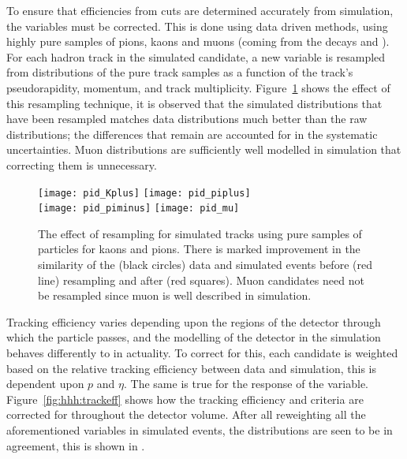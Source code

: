 To ensure that efficiencies from \pid cuts are determined accurately from simulation, the variables
must be corrected.
This is done using data driven methods, using highly pure samples of pions, kaons
and muons (coming from the decays \decay{\Dstarp}{\Dz(\to\kpi)\pip} and
\jpsitomumu).
For each hadron track in the simulated \Bp candidate, a new \pid variable is resampled from \pid
distributions of the pure track samples as a function of the track's pseudorapidity, momentum, and
track multiplicity.
Figure~\ref{fig:hhh:pid} shows the effect of this resampling technique, it is observed that the
simulated \pid distributions that have been resampled matches data distributions much better than the
raw distributions; the differences that remain are accounted for in the systematic uncertainties.
Muon \pid distributions are sufficiently well modelled in simulation that correcting them is
unnecessary.

\begin{figure}[t]
  \begin{center}
    \texttt{[image: pid\_Kplus]}
    \texttt{[image: pid\_piplus]}\\
    \texttt{[image: pid\_piminus]}
    \texttt{[image: pid\_mu]}
    \caption[Effect of resampling PID variables in simulation]
    {
      The effect of \pid resampling for simulated tracks using pure samples of particles for kaons
      and pions.
      There is marked improvement in the similarity of the (black circles) \btojpsikpipi data and
      simulated events before (red line) resampling and after (red squares).
      Muon candidates need not be resampled since muon \pid is well described in simulation.
    }
    \label{fig:hhh:pid}
  \end{center}
\end{figure}


Tracking efficiency varies depending upon the regions of the detector through which the particle
passes, and the modelling of the detector in the simulation behaves differently to in actuality.
To correct for this, each candidate is weighted based on the relative tracking efficiency between
data and simulation, this is dependent upon $p$ and $\eta$.
The same is true for the response of the \ismuon variable.
Figure~\ref{fig:hhh:trackeff} shows how the tracking efficiency and \ismuon criteria are corrected
for throughout the detector volume.
After all reweighting all the aforementioned variables in simulated events, the \BDT distributions
are seen to be in agreement, this is shown in .


